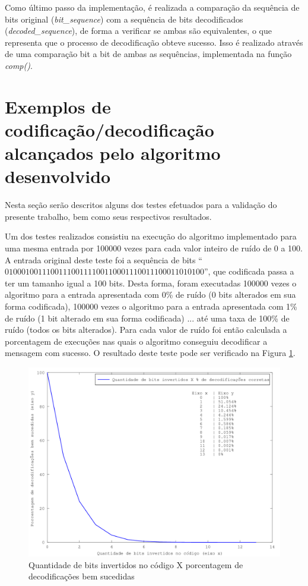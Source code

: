 \documentclass[12pt]{article}
\begin{document}
Como último passo da implementação, é realizada a comparação da sequência de bits original (\emph{bit\_sequence}) com a sequência de bits decodificados (\emph{decoded\_sequence}), de forma a verificar se ambas são equivalentes, o que representa que o processo de decodificação obteve sucesso. Isso é realizado através de uma comparação bit a bit de ambas as sequências, implementada na função \emph{comp()}.

\section{Exemplos de codificação/decodificação alcançados pelo algoritmo desenvolvido}

Nesta seção serão descritos alguns dos testes efetuados para a validação do presente trabalho, bem como seus respectivos resultados.

Um dos testes realizados consistiu na execução do algoritmo implementado para uma mesma entrada por 100000 vezes para cada valor inteiro de ruído de 0 a 100. A entrada original deste teste foi a sequência de bits ``$010001001110011100111100110001110011100011010100$'', que codificada passa a ter um tamanho igual a 100 bits. Desta forma, foram executadas 100000 vezes o algoritmo para a entrada apresentada com 0\% de ruído (0 bits alterados em sua forma codificada), 100000 vezes o algoritmo para a entrada apresentada com 1\% de ruído (1 bit alterado em sua forma codificada) ... até uma taxa de 100\% de ruído (todos os bits alterados). Para cada valor de ruído foi então calculada a porcentagem de execuções nas quais o algoritmo conseguiu decodificar a mensagem com sucesso. O resultado deste teste pode ser verificado na Figura \ref{fig:cod100}.

\begin{figure}[!ht]
\centering
\caption{Quantidade de bits invertidos no código X porcentagem de decodificações bem sucedidas}
\label{fig:cod100}
\includegraphics[scale=0.6]{plot.png}
\end{figure}
\end{document}
